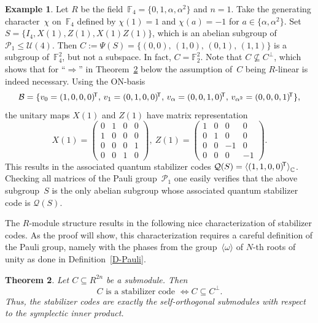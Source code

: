 \documentclass[11pt]{article}
\newtheorem{theo}{Theorem}[section]
\theoremstyle{definition}
\newtheorem{exa}[theo]{Example}
\numberwithin{equation}{section}
\newcommand{\F}{{\mathbb F}}
\newcommand{\C}{{\mathbb C}}
\newcommand{\cP}{{\mathcal P}}
\newcommand{\cQ}{{\mathcal Q}}
\newcommand{\cB}{{\mathcal B}}
\newcommand{\cU}{{\mathcal U}}
\newcommand{\T}{\mbox{$\!^{\sf T}$}}
\newcommand{\group}[1]{\mbox{$\langle{#1}\rangle$}}
\newcounter{alp}
\newcounter{ara}
\newcounter{rom}
\begin{document}
\begin{exa}\label{E-AddStabCode}
Let $R$ be the field~$\F_4=\{0,1,\alpha,\alpha^2\}$ and $n=1$.
Take the generating character~$\chi$ on~$\F_4$ defined by $\chi(1)=1$ and $\chi(a)=-1$ for $a \in\{\alpha,\alpha^2\}$.
Set $S=\{I_{4},X(1),Z(1),X(1)Z(1)\}$, which is an abelian subgroup of $\cP_1\leq\cU(4)$.
Then $C:=\Psi(S)=\{(0,0),\,(1,0),\,(0,1),\,(1,1)\}$ is a subgroup of~$\F_4^2$, but not a subspace.
In fact, $C=\F_2^2$.
Note that $C\not\subseteq C^\perp$, which shows that for ``$\Rightarrow$'' in Theorem~\ref{P-StabCodeSO} below the assumption of~$C$
being $R$-linear is indeed necessary.
Using the ON-basis
\[
   \cB=\{v_0=(1,0,0,0)\T,\,v_1=(0,1,0,0)\T,\,v_\alpha=(0,0,1,0)\T,\,v_{\alpha^2}=(0,0,0,1)\T\},
\]
the unitary maps $X(1)$ and $Z(1)$ have matrix representation
\[
    X(1)=\begin{pmatrix}0&1&0&0\\1&0&0&0\\0&0&0&1\\0&0&1&0\end{pmatrix},\
    Z(1)=\begin{pmatrix}1&0&0&0\\0&1&0&0\\0&0&-1&0\\0&0&0&-1\end{pmatrix}.
\]
This results in the associated quantum stabilizer codes $\cQ(S)=\group{(1,1,0,0)\T}_{\C}$.
Checking all matrices of the Pauli group~$\cP_1$ one easily verifies that the above subgroup~$S$ is the only abelian subgroup whose associated quantum stabilizer code is $\cQ(S)$.
\end{exa}



The $R$-module structure results in the following nice characterization of stabilizer codes.
As the proof will show, this characterization requires a careful definition of the Pauli group, namely with the phases from the group~$\group{\omega}$
of $N$-th roots of unity as done in Definition~\ref{D-Pauli}.

\begin{theo}\label{P-StabCodeSO}
Let $C\subseteq R^{2n}$ be a submodule. Then
\[
  C\text{ is a stabilizer code }\Longleftrightarrow C\subseteq C^\perp.
\]
Thus, the stabilizer codes are exactly the self-orthogonal submodules with respect to the symplectic inner product.
\end{theo}
\end{document}

